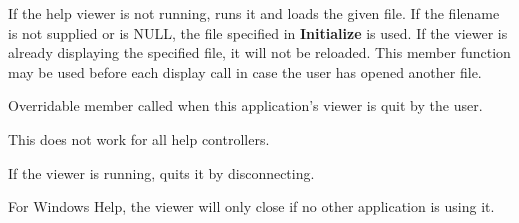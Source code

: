 \label{wxhelpcontrollerloadfile}


If the help viewer is not running, runs it and loads the given file.
If the filename is not supplied or is
NULL, the file specified in {\bf Initialize} is used. If the viewer is
already displaying the specified file, it will not be reloaded. This
member function may be used before each display call in case the user
has opened another file.

\label{wxhelpcontrolleronquit}


Overridable member called when this application's viewer is quit by the user.

This does not work for all help controllers.

\label{wxhelpcontrollerquit}


If the viewer is running, quits it by disconnecting.

For Windows Help, the viewer will only close if no other application is using it.

